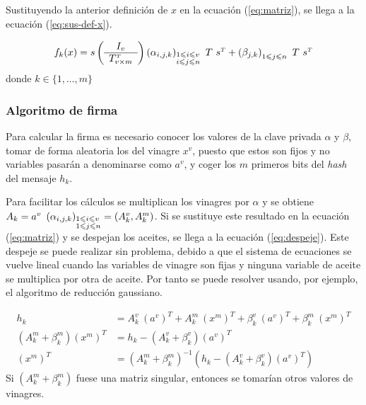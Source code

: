 Sustituyendo la anterior definición de $x$ en la ecuación (\ref{eq:matriz}), se llega a la ecuación (\ref{eq:sus-def-x}).

\begin{equation}
	f_k(x) = s  
	\left(\begin{array}{c}
		I_v \\
		\hline
		T^{\scriptscriptstyle T}_{v \times m}
	\end{array}\right)
	\left(\alpha_{i,j,k}\right)_{\begin{subarray}{l}{1\leqslant i \leqslant v }\\ {i \leqslant j \leqslant n}\end{subarray}}\ T \ s^{\scriptscriptstyle T} + 
	\left(\beta_{j,k}\right)_{1\leqslant j\leqslant n}\ T\ s^{\scriptscriptstyle T}
	\label{eq:sus-def-x}
\end{equation}
donde $k \in \{1,\dots,m\}$


\subsubsection{Algoritmo de firma}

Para calcular la firma es necesario conocer los valores de la clave privada $\alpha$ y $\beta$, tomar de forma aleatoria los del vinagre $x^v$, puesto que estos son fijos y no variables pasarán a denominarse como $a^v$, y coger los $m$ primeros bits del \textit{hash} del mensaje $h_k$.

Para facilitar los cálculos se multiplican los vinagres por $\alpha$ y se obtiene \mbox{$A_k = a^v\ \left(\alpha_{i,j,k}\right)_{\begin{subarray}{l}{1 \leqslant i\leqslant v }\\ {1\leqslant j \leqslant n}\end{subarray}} = \left(A^v_k, A^m_k\right)$}. Si se sustituye este resultado en la ecuación (\ref{eq:matriz}) y se despejan los aceites, se llega a la ecuación (\ref{eq:despeje}). Este despeje se puede realizar sin problema, debido a que el sistema de ecuaciones se vuelve lineal cuando las variables de vinagre son fijas y ninguna variable de aceite se multiplica por otra de aceite. Por tanto se puede resolver usando, por ejemplo, el algoritmo de reducción gaussiano.

\begin{align}
h_k &= A_k^v\ (a^v)^{\scriptscriptstyle T} +  A_k^m\ (x^m)^{\scriptscriptstyle T} + \beta_k^v\ (a^v)^{\scriptscriptstyle T} + \beta_k^m\ (x^m)^{\scriptscriptstyle T}\\
\label{eq:ter-coef}
(A_k^m + \beta_k^m) (x^m)^{\scriptscriptstyle T} &= h_k - (A_k^v + \beta_k^v) (a^v)^{\scriptscriptstyle T}\\
\label{eq:despeje}
(x^m)^{\scriptscriptstyle T} &= (A_k^m + \beta_k^m)^{-1} (h_k - (A_k^v + \beta_k^v) (a^v)^{\scriptscriptstyle T})
\end{align}
Si $(A_k^m + \beta_k^m)$ fuese una matriz singular, entonces se tomarían otros valores de vinagres.

